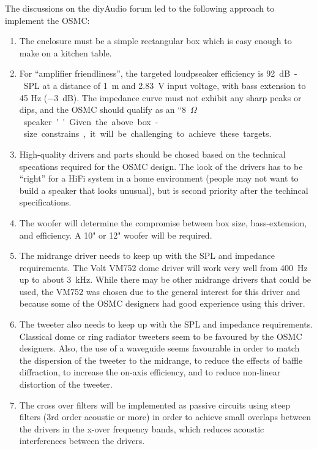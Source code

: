 \documentclass[12pt,a4paper]{article}
\begin{document}
\clearpage

The discussions on the diyAudio forum led to the following approach to implement the OSMC:
\begin{enumerate}

\item The enclosure must be a simple rectangular box which is easy enough to make on a kitchen table.

\item For ``amplifier friendliness'', the targeted loudpseaker efficiency is \SI{92}{dB-SPL} at a distance of \SI{1}{m} and \SI{2.83}{V} input voltage, with bass extension to 45 Hz (\SI{-3}{dB}). The impedance curve must not exhibit any sharp peaks or dips, and the OSMC should qualify as an ``\SI{8}{$\Omega$} speaker''. Given the above box-size constrains, it will be challenging to achieve these targets.

\item High-quality drivers and parts should be chosed based on the technical specations required for the OSMC design. The look of the drivers has to be ``right'' for a HiFi system in a home environment (people may not want to build a speaker that looks unusual), but is second priority after the techincal specifications.

\item The woofer will determine the compromise between box size, bass-extension, and efficiency. A 10" or 12" woofer will be required.

\item The midrange driver needs to keep up with the SPL and impedance requirements. The Volt VM752 dome driver will work very well from \SI{400}{Hz} up to about \SI{3}{kHz}. While there may be other midrange drivers that could be used, the VM752 was chosen due to the general interest for this driver and because some of the OSMC designers had good experience using this driver.

\item The tweeter also needs to keep up with the SPL and impedance requirements. Classical dome or ring radiator tweeters seem to be favoured by the OSMC designers. Also, the use of a waveguide seems favourable in order to match the dispersion of the tweeter to the midrange, to reduce the effects of baffle diffraction, to increase the on-axis efficiency, and to reduce non-linear distortion of the tweeter.

\item The cross over filters will be implemented as passive circuits using steep filters (3rd order acoustic or more) in order to achieve small overlaps between the drivers in the x-over frequency bands, which reduces acoustic interferences between the drivers.

\end{enumerate}
\end{document}
